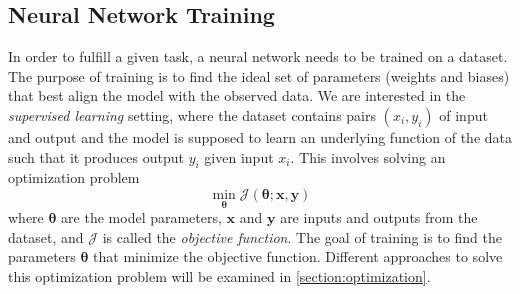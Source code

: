 \subsection{Neural Network Training} \label{section:training}
In order to fulfill a given task, a neural network needs
to be trained on a dataset. The purpose of training is to find
the ideal set of parameters (weights and biases) 
that best align the model with the 
observed data. We are interested in the 
\textit{supervised learning} setting, where the dataset
contains pairs \((x_i, y_i)\) of input and output and the model
is supposed to learn an underlying function of the data 
such that it produces output \(y_i\) given input \(x_i\).
This involves solving an optimization problem
\begin{equation}
    \min_{\bm{\theta}} \mathcal{J}(\bm{\theta}; \mathbf{x}, \mathbf{y})
\end{equation}
where $\bm{\theta}$ are the model parameters, $\mathbf{x}$ and
$\mathbf{y}$ are inputs and outputs from the dataset, 
and $\mathcal{J}$ is 
called the \textit{objective function}. 
The goal of training is to find 
the parameters $\bm{\theta}$ that minimize the objective function. 
Different approaches to solve this optimization problem 
will be examined in \autoref{section:optimization}.

